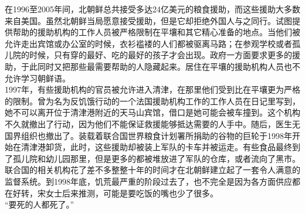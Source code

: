 在1996至2005年间，北朝鲜总共接受多达24亿美元的粮食援助，而这些援助大多数来自美国。虽然北朝鲜当局愿意接受援助，但是它却拒绝外国人与之同行。试图提供帮助的援助机构的工作人员被严格限制在平壤和其它精心准备的地点。当他们被允许走出宾馆或办公室的时候，衣衫褴褛的人们都被驱离马路；在参观学校或者孤儿院的时候，只有穿的最好、吃的最好的孩子才会出现。政府一方面要求更多的援助，于此同时又把那些最需要帮助的人隐藏起来。居住在平壤的援助机构人员也不允许学习朝鲜语。\\

1997年，有些援助机构的官员被允许进入清津，在那里他们受到比在平壤更为严格的限制。曾为名为反饥饿行动的一个法国援助机构工作的工作人员在日记里写到，她不可以离开位于清津港附近的天马山宾馆，借口是她可能会被车撞到。这个机构不久就撤出了行动，因为他们不能保证救援能够抵达需要的人手中。随后，医生无国界组织也撤出了。装载着联合国世界粮食计划署所捐助的谷物的巨轮于1998年开始在清津港卸货，此时，这些援助却被装上军队的卡车并被运走。有些食品最终到了孤儿院和幼儿园那里，但是更多的都被堆放进了军队的仓库，或者流向了黑市。联合国的相关机构花了差不多整整十年的时间才在北朝鲜建立起了一套令人满意的监督系统。到1998年底，饥荒最严重的阶段过去了，也不完全是因为各方面供应都在好转，宋女士后来推测，可能是要吃饭的嘴也少了很多。\\

“要死的人都死了。”\\
